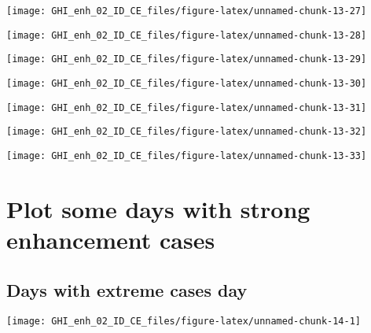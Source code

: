 \documentclass[
  10pt,
  a4paper,oneside]{article}
\begin{document}
\begin{center}\texttt{[image: GHI\_enh\_02\_ID\_CE\_files/figure-latex/unnamed-chunk-13-27]} \end{center}

\begin{center}\texttt{[image: GHI\_enh\_02\_ID\_CE\_files/figure-latex/unnamed-chunk-13-28]} \end{center}

\begin{center}\texttt{[image: GHI\_enh\_02\_ID\_CE\_files/figure-latex/unnamed-chunk-13-29]} \end{center}

\begin{center}\texttt{[image: GHI\_enh\_02\_ID\_CE\_files/figure-latex/unnamed-chunk-13-30]} \end{center}

\begin{center}\texttt{[image: GHI\_enh\_02\_ID\_CE\_files/figure-latex/unnamed-chunk-13-31]} \end{center}

\begin{center}\texttt{[image: GHI\_enh\_02\_ID\_CE\_files/figure-latex/unnamed-chunk-13-32]} \end{center}

\begin{center}\texttt{[image: GHI\_enh\_02\_ID\_CE\_files/figure-latex/unnamed-chunk-13-33]} \end{center}

\FloatBarrier

\hypertarget{plot-some-days-with-strong-enhancement-cases}{%
\section{Plot some days with strong enhancement cases}\label{plot-some-days-with-strong-enhancement-cases}}

\FloatBarrier

\hypertarget{days-with-extreme-cases-day}{%
\subsection{Days with extreme cases day}\label{days-with-extreme-cases-day}}

\begin{center}\texttt{[image: GHI\_enh\_02\_ID\_CE\_files/figure-latex/unnamed-chunk-14-1]} \end{center}
\end{document}
